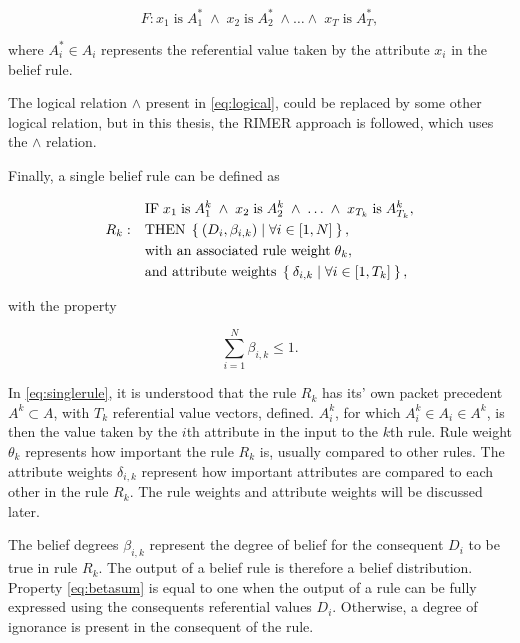 \begin{equation}
    \label{eq:logical}
    F : x_1\;\text{is}\;A_1^*\;\land\;x_2\;\text{is}\;A_2^*\;\land\dots\land\;x_T\;\text{is}\;A_T^*,
\end{equation}

where $A_i^* \in A_i$ represents the referential value taken by the attribute $x_i$ in the belief rule.

The logical relation $\land$ present in \eqref{eq:logical}, could be replaced by some other logical relation, but in this thesis,
the RIMER approach is followed, which uses the $\land$ relation.

Finally, a single belief rule can be defined as

\begin{align}
\begin{split}
    \label{eq:singlerule}
    & \text{IF}\; x_1\; \text{is}\; A_1^k\; \land\; x_2\; \text{is}\; A_2^k\; \land\; \dots\; \land\; x_{T_k}\; \text{is}\; A_{T_k}^k, \\
    R_k:\quad & \text{THEN}\; \Set{\left( D_i, \beta_{i, k} \right) \mid \forall i \in \left[1, N \right]}, \\
    & \text{with an associated rule weight}\; \theta_k, \\
    & \text{and attribute weights}\; \Set{\delta_{i, k} \mid \forall i \in \left[ 1, T_k \right]},
\end{split}
\end{align}

with the property

\begin{equation}
    \label{eq:betasum}
    \sum_{i=1}^{N} \beta_{i, k} \leq 1.
\end{equation}


In \eqref{eq:singlerule}, it is understood that the rule $R_k$ has its' own packet precedent $A^k \subset A$, with
$T_k$ referential value vectors, defined. $A_i^k$, for which $A_i^k \in A_i \in A^k$, is then the value taken by the $i$th attribute in the input to the $k$th rule.
Rule weight $\theta_k$ represents how important the rule $R_k$ is, usually compared to other rules.
The attribute weights
$\delta_{i,k}$ represent how important attributes are compared to each other in the rule $R_k$. The rule weights and attribute weights will
be discussed later.

The belief degrees $\beta_{i, k}$ represent the degree of belief for the consequent
$D_i$ to be true in rule $R_k$. The output of a belief rule is therefore a belief distribution.
Property \eqref{eq:betasum} is equal to one when the output of a rule can be fully expressed using
the consequents referential values $D_i$. Otherwise, a degree of ignorance is present in the consequent of the rule.

